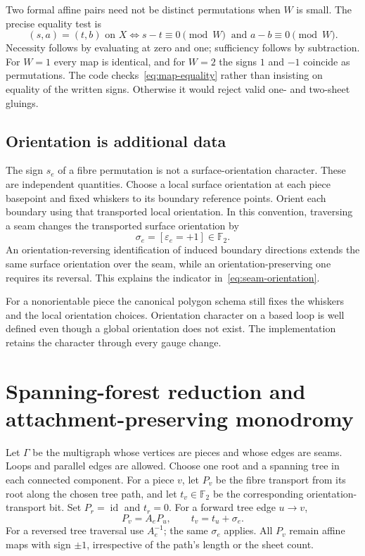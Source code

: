 \documentclass[11pt,a4paper]{article}
\theoremstyle{definition}\newtheorem{definition}[theorem]{Definition}
\theoremstyle{remark}\newtheorem{remark}[theorem]{Remark}
\newcommand{\F}{\mathbb F_2}
\newcommand{\id}{\operatorname{id}}
\begin{document}
Two formal affine pairs need not be distinct permutations when $W$ is small.
The precise equality test is
\begin{equation}\label{eq:map-equality}
 (s,a)=(t,b)\text{ on }X
 \iff s-t\equiv0\pmod W\ \text{ and }a-b\equiv0\pmod W.
\end{equation}
Necessity follows by evaluating at zero and one; sufficiency follows by
subtraction. For $W=1$ every map is identical, and for $W=2$ the signs $1$
and $-1$ coincide as permutations. The code checks~\eqref{eq:map-equality}
rather than insisting on equality of the written signs. Otherwise it would
reject valid one- and two-sheet gluings.

\subsection{Orientation is additional data}

The sign $s_e$ of a fibre permutation is not a surface-orientation character.
These are independent quantities. Choose a local surface orientation at each
piece basepoint and fixed whiskers to its boundary reference points. Orient
each boundary using that transported local orientation. In this convention,
traversing a seam changes the transported surface orientation by
\begin{equation}\label{eq:seam-orientation}
 \sigma_e=[\varepsilon_e=+1]\in\F.
\end{equation}
An orientation-reversing identification of induced boundary directions
extends the same surface orientation over the seam, while an
orientation-preserving one requires its reversal. This explains the
indicator in~\eqref{eq:seam-orientation}.

For a nonorientable piece the canonical polygon schema still fixes the
whiskers and the local orientation choices. Orientation character on a
based loop is well defined even though a global orientation does not exist.
The implementation retains the character through every gauge change.

\section{Spanning-forest reduction and attachment-preserving monodromy}
\label{sec:gauge}

Let $\Gamma$ be the multigraph whose vertices are pieces and whose edges are
seams. Loops and parallel edges are allowed. Choose one root and a spanning
tree in each connected component. For a piece $v$, let $P_v$ be the fibre
transport from its root along the chosen tree path, and let $t_v\in\F$ be
the corresponding orientation-transport bit. Set $P_r=\id$ and $t_r=0$.
For a forward tree edge $u\to v$,
\[
 P_v=A_eP_u,\qquad t_v=t_u+\sigma_e.
\]
For a reversed tree traversal use $A_e^{-1}$; the same $\sigma_e$ applies.
All $P_v$ remain affine maps with sign $\pm1$, irrespective of the path's
length or the sheet count.
\end{document}
